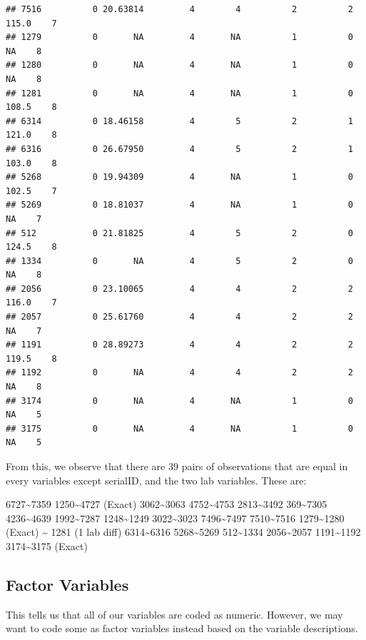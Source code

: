 \documentclass[
  11pt,
]{article}
\begin{document}
\begin{verbatim}
## 7516          0 20.63814         4        4          2          2    115.0    7
## 1279          0       NA         4       NA          1          0       NA    8
## 1280          0       NA         4       NA          1          0       NA    8
## 1281          0       NA         4       NA          1          0    108.5    8
## 6314          0 18.46158         4        5          2          1    121.0    8
## 6316          0 26.67950         4        5          2          1    103.0    8
## 5268          0 19.94309         4       NA          1          0    102.5    7
## 5269          0 18.81037         4       NA          1          0       NA    7
## 512           0 21.81825         4        5          2          0    124.5    8
## 1334          0       NA         4        5          2          0       NA    8
## 2056          0 23.10065         4        4          2          2    116.0    7
## 2057          0 25.61760         4        4          2          2       NA    7
## 1191          0 28.89273         4        4          2          2    119.5    8
## 1192          0       NA         4        4          2          2       NA    8
## 3174          0       NA         4       NA          1          0       NA    5
## 3175          0       NA         4       NA          1          0       NA    5
\end{verbatim}

From this, we observe that there are 39 pairs of observations that are
equal in every variables except serialID, and the two lab variables.
These are:

6727\textasciitilde7359 1250\textasciitilde4727 (Exact)
3062\textasciitilde3063 4752\textasciitilde4753 2813\textasciitilde3492
369\textasciitilde7305 4236\textasciitilde4639 1992\textasciitilde7287
1248\textasciitilde1249 3022\textasciitilde3023 7496\textasciitilde7497
7510\textasciitilde7516 1279\textasciitilde1280 (Exact)
\textasciitilde{} 1281 (1 lab diff) 6314\textasciitilde6316
5268\textasciitilde5269 512\textasciitilde1334 2056\textasciitilde2057
1191\textasciitilde1192 3174\textasciitilde3175 (Exact)

\hypertarget{factor-variables}{%
\subsection{Factor Variables}\label{factor-variables}}

This tells us that all of our variables are coded as numeric. However,
we may want to code some as factor variables instead based on the
variable descriptions.
\end{document}

